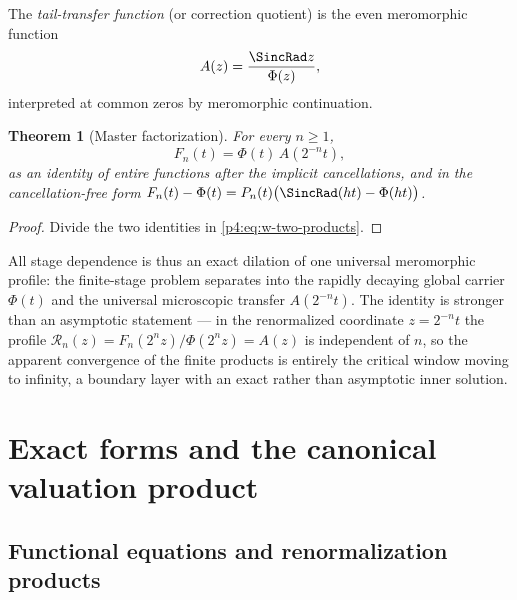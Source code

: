 \documentclass[11pt,oneside]{article}
\numberwithin{equation}{section}
\newtheorem{theorem}{Theorem}[section]
\theoremstyle{definition}
\theoremstyle{remark}
\begin{document}
\begin{definition}
\label{p4:def:w-A}
The \emph{tail-transfer function} (or correction quotient) is the even
meromorphic function
\begin{equation}
 A(z)=\frac{\SincRad z}{\Phi(z)},
 \label{p4:eq:w-A-def}
\end{equation}
interpreted at common zeros by meromorphic continuation.
\end{definition}

\begin{theorem}[Master factorization]
\label{p4:thm:w-master}
For every $n\ge1$,
\begin{equation}
 F_n(t)=\Phi(t)\,A(2^{-n}t),
 \label{p4:eq:w-master}
\end{equation}
as an identity of entire functions after the implicit cancellations, and in
the cancellation-free form
$F_n(t)-\Phi(t)=P_n(t)\bigl(\SincRad(ht)-\Phi(ht)\bigr)$.
\end{theorem}

\begin{proof}
Divide the two identities in \eqref{p4:eq:w-two-products}.
\end{proof}

All stage dependence is thus an exact dilation of one universal meromorphic
profile: the finite-stage problem separates into the rapidly decaying global
carrier $\Phi(t)$ and the universal microscopic transfer $A(2^{-n}t)$.  The
identity is stronger than an asymptotic statement --- in the renormalized
coordinate $z=2^{-n}t$ the profile
$\mathscr R_n(z)=F_n(2^nz)/\Phi(2^nz)=A(z)$ is independent of $n$, so the
apparent convergence of the finite products is entirely the critical window
moving to infinity, a boundary layer with an exact rather than asymptotic
inner solution.


\section{Exact forms and the canonical valuation product}
\label{p4:sec:w-forms}

\subsection{Functional equations and renormalization products}
\end{document}

